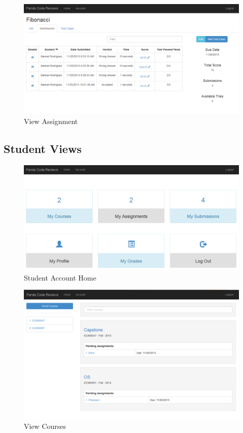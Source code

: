 \begin{figure}[H]
	\centering
	\includegraphics[width=\textwidth]{img/assignment-prof-screen}
	\caption{View Assignment}
\end{figure}

\subsection{Student Views}

\begin{figure}[H]
	\centering
	\includegraphics[width=\textwidth]{img/homestudent-screen}
	\caption{Student Account Home}
\end{figure}

\begin{figure}[H]
	\centering
	\includegraphics[width=\textwidth]{img/courses-screen}
	\caption{View Courses}
\end{figure}

